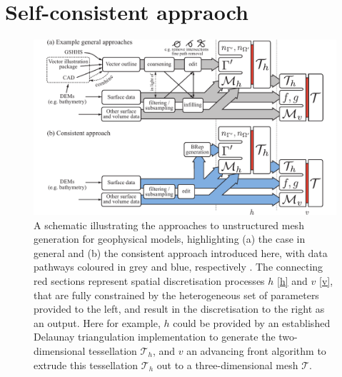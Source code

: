 \documentclass[a4paper, 10pt]{book}
\providecommand{\twod}{two-dimensional\xspace}
\providecommand{\threed}{three-dimensional\xspace}
\begin{document}
\chapter{Self-consistent appraoch}
%
\begin{figure}[!h]
\vspace*{2mm}
\begin{center}
\includegraphics[width=\textwidth]{fig/brepschematic.pdf}
\end{center}
\vspace{-3.8ex}
\caption{A schematic illustrating the approaches to unstructured mesh generation for geophysical models, highlighting
(a) the case in general
and
(b) the consistent approach introduced here,
with data pathways coloured in grey and blue, respectively
\citep[from][]{candybrep}.
%
The connecting red sections represent spatial discretisation processes $h$ \cref{h} and $v$ \cref{v}, that are fully constrained by the heterogeneous set of parameters provided to the left, and result in the discretisation to the right as an output.
%
Here for example, $h$ could be provided by an established Delaunay triangulation implementation to generate the \twod tessellation $\mathcal{T}_h$, and $v$ an advancing front algorithm to extrude this tessellation $\mathcal{T}_h$ out to
a \threed mesh $\mathcal{T}$.
}
\label{fig:schematic}
\vspace{-2ex}
\end{figure}
\end{document}

